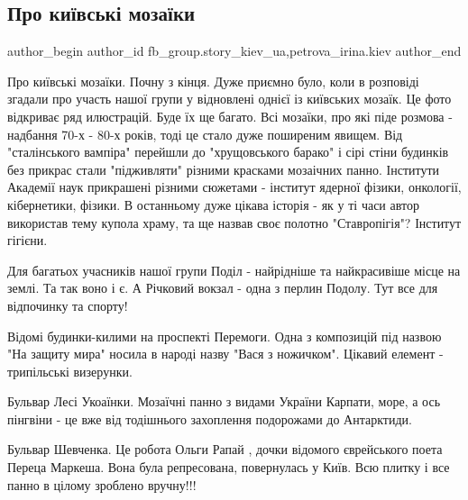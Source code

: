  
 
 
 
 
 
\subsection{Про київські мозаїки}
\label{sec:30_04_2020.fb.fb_group.story_kiev_ua.2.kievskie_mozaiki}
 
\ifcmt
 author_begin
   author_id fb_group.story_kiev_ua,petrova_irina.kiev
 author_end
\fi

Про київські мозаїки. Почну з кінця. Дуже приємно було, коли в розповіді
згадали про участь нашої групи у відновлені однієї із київських мозаїк. Це фото
відкриває ряд илюстрацій. Буде їх ще багато. Всі мозаїки, про які піде розмова
- надбання 70-х - 80-х років, тоді це стало дуже поширеним явищем. Від
"сталінського  вампіра" перейшли до "хрущовського барако" і сірі стіни будинків
без прикрас стали "підживляти" різними красками мозаічних панно. Інститути
Академії наук  прикрашені різними сюжетами - інститут ядерної фізики,
онкології, кібернетики, фізики. В останньому дуже цікава історія - як у ті часи
автор використав тему купола храму, та ще назвав своє полотно "Ставропігія"?
Інститут гігієни.


Для багатьох учасників нашої групи Поділ - найрідніше та найкрасивіше місце на
землі. Та так воно і є. А Річковий вокзал - одна з перлин Подолу.  Тут все для
відпочинку та спорту!

Відомі будинки-килими на проспекті Перемоги. Одна з композицій під назвою "На
защиту мира" носила в народі назву "Вася з ножичком". Цікавий елемент -
трипільські визерунки.

Бульвар Лесі Укоаїнки. Мозаїчні панно з видами України Карпати, море, а ось
пінгвіни - це вже від тодішнього захоплення подорожами до Антарктиди.

Бульвар Шевченка. Це робота Ольги Рапай , дочки відомого єврейського поета
Переца Маркеша. Вона була репресована, повернулась у Київ. Всю плитку і все
панно в цілому зроблено вручну!!!

